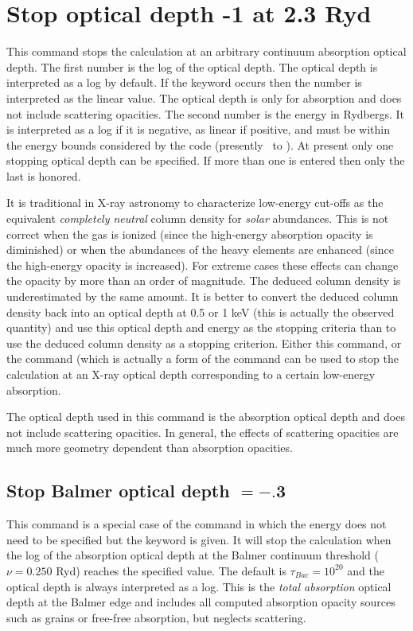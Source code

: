 \section{Stop optical depth -1 at 2.3 Ryd}

This command stops the calculation at an arbitrary continuum absorption
optical depth.
The first number is the log of the optical depth.
The optical depth is interpreted as a log by default.
If the  keyword
occurs then the number is interpreted as the linear value.
The optical
depth is only for absorption and does not include scattering opacities.
The second number is the energy in Rydbergs.
It is interpreted as a log
if it is negative, as linear if positive, and must be within the energy
bounds considered by the code (presently \emm\ to
\egamry).
At present only one stopping optical depth can be specified.
If more than
one is entered then only the last is honored.

It is traditional in X-ray astronomy to characterize low-energy cut-offs
as the equivalent \emph{completely neutral} column density
for \emph{solar} abundances.
This is not correct when the gas is ionized
(since the high-energy absorption
opacity is diminished) or when the abundances of the heavy elements are
enhanced (since the high-energy opacity is increased).
For extreme cases
these effects can change the opacity by more than an order of magnitude.
The deduced column density is underestimated by the same amount.
It is
better to convert the deduced column density back into an optical depth
at 0.5 or 1 keV (this is actually the observed quantity)
and use this optical
depth and energy as the stopping criteria than to use the deduced column
density as a stopping criterion.
Either this command, or the  command (which is actually a form of the
 command can be used to stop
the calculation
at an X-ray optical depth corresponding to a certain low-energy absorption.

The optical depth used in this command is the absorption optical depth
and does not include scattering opacities.
In general, the effects of
scattering opacities are much more geometry dependent than absorption
opacities.

\subsection{Stop Balmer optical depth $= -.$3}

This command is a special case of the 
command in which the energy does not need to be specified
but the keyword  is given.
It will stop the calculation when the log of the absorption
optical depth
at the Balmer continuum threshold ($\nu = 0.250$ Ryd)
reaches the specified value.
The default is $\tau_{Bac} = 10^{20}$ and the optical depth
is always interpreted as a log.
This is the \emph{total absorption} optical depth at the Balmer edge
and includes all computed absorption opacity sources such as grains or
free-free absorption, but neglects scattering.

